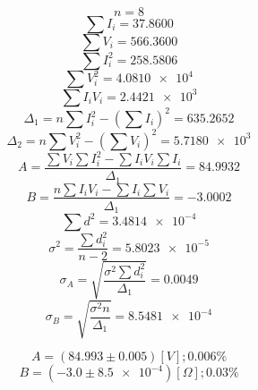 \documentclass[letter,11pt]{article}
\begin{document}
\begin{equation*}
    n = 8
\end{equation*}
\begin{equation*}
    \sum I_i = 37.8600
\end{equation*}
\begin{equation*}
    \sum V_i = 566.3600
\end{equation*}
\begin{equation*}
    \sum I^2_i = 258.5806
\end{equation*}
\begin{equation*}
    \sum V^2_i = \num{4.0810 e4}
\end{equation*}
\begin{equation*}
    \sum I_i V_i = \num{2.4421 e3}
\end{equation*}
\begin{equation*}
    \Delta_1 = n \sum I^2_i - \left( \sum I_i \right)^2 = 635.2652
\end{equation*}
\begin{equation*}
    \Delta_2 = n \sum V^2_i - \left( \sum V_i \right)^2 = \num{5.7180 e3}
\end{equation*}
\begin{equation*}
    A = \frac{\sum V_i \sum I^2_i - \sum I_i V_i \sum I_i}{\Delta_1} = 84.9932
\end{equation*}
\begin{equation*}
    B = \frac{n \sum I_i V_i - \sum I_i \sum V_i}{\Delta_1} = -3.0002
\end{equation*}
\begin{equation*}
    \sum d^2 = \num{3.4814 e-4}
\end{equation*}
\begin{equation*}
    \sigma^2 = \frac{\sum d^2_i}{n-2} = \num{5.8023 e-5}
\end{equation*}
\begin{equation*}
    \sigma_A = \sqrt{\frac{\sigma^2 \sum d^2_i}{\Delta_1}} = 0.0049
\end{equation*}
\begin{equation*}
    \sigma_B = \sqrt{\frac{\sigma^2 n}{\Delta_1}} = \num{8.5481 e-4}
\end{equation*}

\begin{equation*}
    A = (84.993 \pm 0.005)[V]; 0.006 \%
\end{equation*}
\begin{equation*}
    B = (-3.0 \pm \num{8.5 e-4})[\Omega]; 0.03 \%
\end{equation*}
\end{document}
